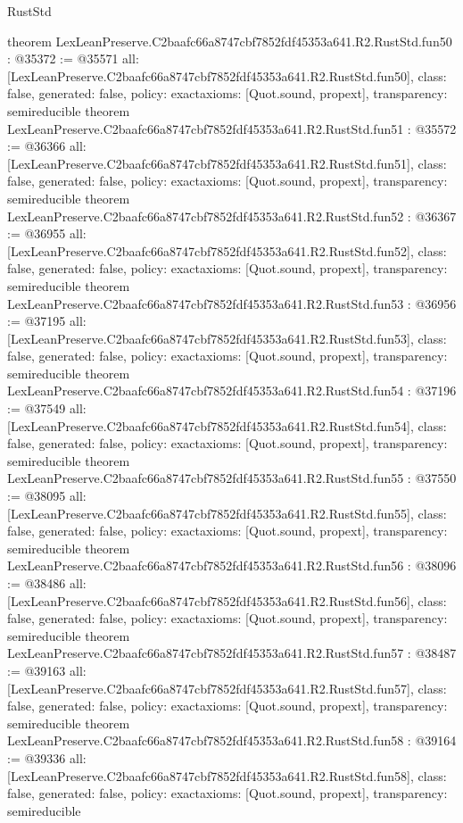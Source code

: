 \begin{lexlean}{RustStd}
\begin{coremodule}
{}
theorem LexLeanPreserve.C2baafc66a8747cbf7852fdf45353a641.R2.RustStd.fun50 : @35372 := @35571 {
  all: [LexLeanPreserve.C2baafc66a8747cbf7852fdf45353a641.R2.RustStd.fun50],
  class: false,
  generated: false,
  policy: exact{axioms: [Quot.sound, propext]},
  transparency: semireducible
}
theorem LexLeanPreserve.C2baafc66a8747cbf7852fdf45353a641.R2.RustStd.fun51 : @35572 := @36366 {
  all: [LexLeanPreserve.C2baafc66a8747cbf7852fdf45353a641.R2.RustStd.fun51],
  class: false,
  generated: false,
  policy: exact{axioms: [Quot.sound, propext]},
  transparency: semireducible
}
theorem LexLeanPreserve.C2baafc66a8747cbf7852fdf45353a641.R2.RustStd.fun52 : @36367 := @36955 {
  all: [LexLeanPreserve.C2baafc66a8747cbf7852fdf45353a641.R2.RustStd.fun52],
  class: false,
  generated: false,
  policy: exact{axioms: [Quot.sound, propext]},
  transparency: semireducible
}
theorem LexLeanPreserve.C2baafc66a8747cbf7852fdf45353a641.R2.RustStd.fun53 : @36956 := @37195 {
  all: [LexLeanPreserve.C2baafc66a8747cbf7852fdf45353a641.R2.RustStd.fun53],
  class: false,
  generated: false,
  policy: exact{axioms: [Quot.sound, propext]},
  transparency: semireducible
}
theorem LexLeanPreserve.C2baafc66a8747cbf7852fdf45353a641.R2.RustStd.fun54 : @37196 := @37549 {
  all: [LexLeanPreserve.C2baafc66a8747cbf7852fdf45353a641.R2.RustStd.fun54],
  class: false,
  generated: false,
  policy: exact{axioms: [Quot.sound, propext]},
  transparency: semireducible
}
theorem LexLeanPreserve.C2baafc66a8747cbf7852fdf45353a641.R2.RustStd.fun55 : @37550 := @38095 {
  all: [LexLeanPreserve.C2baafc66a8747cbf7852fdf45353a641.R2.RustStd.fun55],
  class: false,
  generated: false,
  policy: exact{axioms: [Quot.sound, propext]},
  transparency: semireducible
}
theorem LexLeanPreserve.C2baafc66a8747cbf7852fdf45353a641.R2.RustStd.fun56 : @38096 := @38486 {
  all: [LexLeanPreserve.C2baafc66a8747cbf7852fdf45353a641.R2.RustStd.fun56],
  class: false,
  generated: false,
  policy: exact{axioms: [Quot.sound, propext]},
  transparency: semireducible
}
theorem LexLeanPreserve.C2baafc66a8747cbf7852fdf45353a641.R2.RustStd.fun57 : @38487 := @39163 {
  all: [LexLeanPreserve.C2baafc66a8747cbf7852fdf45353a641.R2.RustStd.fun57],
  class: false,
  generated: false,
  policy: exact{axioms: [Quot.sound, propext]},
  transparency: semireducible
}
theorem LexLeanPreserve.C2baafc66a8747cbf7852fdf45353a641.R2.RustStd.fun58 : @39164 := @39336 {
  all: [LexLeanPreserve.C2baafc66a8747cbf7852fdf45353a641.R2.RustStd.fun58],
  class: false,
  generated: false,
  policy: exact{axioms: [Quot.sound, propext]},
  transparency: semireducible
}
\end{coremodule}
\end{lexlean}
